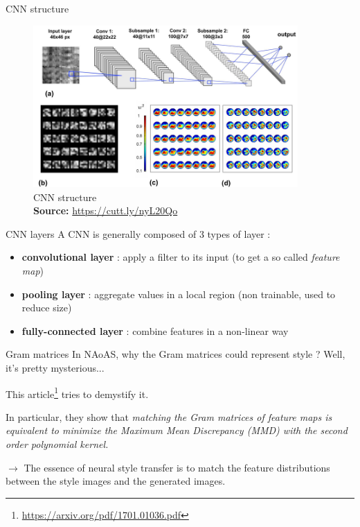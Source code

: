 \documentclass[12pt]{beamer}
\newcommand{\captionsource}[2]{
    \captionsetup{justification=centering}
    \caption*{#1\\\scriptsize\textbf{Source:} \url{#2}}
}
\begin{document}
    \begin{frame}{CNN structure}
        \begin{figure}[H]
            \centering
            \includegraphics[width=0.9\textwidth]{resources/additional/cnn-structure.png}
            \captionsource{CNN structure}{https://cutt.ly/nyL20Qo}
        \end{figure}
    \end{frame}
    
    \begin{frame}{CNN layers}
        A CNN is generally composed of 3 types of layer :

        \begin{itemize}
            \item \textbf{convolutional layer} : apply a filter to its input (to get a so called \textit{feature map})
            \item \textbf{pooling layer} : aggregate values in a local region (non trainable, used to reduce size)
            \item \textbf{fully-connected layer} : combine features in a non-linear way
        \end{itemize}
    \end{frame}
    
    \begin{frame}{Gram matrices}
        In NAoAS, why the Gram matrices could represent style ? \footnotesize{Well, it's pretty mysterious...}
        
        \normalsize{
            This article\footnote{\url{https://arxiv.org/pdf/1701.01036.pdf}} tries to demystify it.
            
            In particular, they show that \emph{matching the Gram matrices of feature maps is equivalent to minimize the Maximum Mean Discrepancy (MMD) with the second order polynomial kernel.}
        }
        
        \footnotesize{$\longrightarrow$ The essence of neural style transfer is to match the feature distributions between the style images and the generated images.}
    \end{frame}
    
\end{document}
